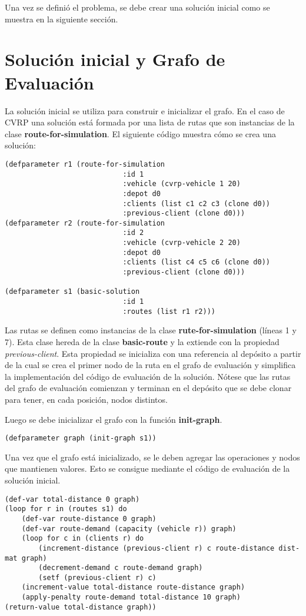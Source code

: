 Una vez se definió el problema, se debe crear una solución inicial como se muestra en la siguiente sección.

\section{Solución inicial y Grafo de Evaluación}\label{4-solution}

La solución inicial se utiliza para construir e inicializar el grafo. En el caso de CVRP una solución está formada por una lista de rutas que son instancias de la clase \textbf{route-for-simulation}. El siguiente código muestra cómo se crea una solución:


\begin{lstlisting}
(defparameter r1 (route-for-simulation 
							:id 1
							:vehicle (cvrp-vehicle 1 20) 
							:depot d0
							:clients (list c1 c2 c3 (clone d0))
							:previous-client (clone d0)))
(defparameter r2 (route-for-simulation 
							:id 2 
							:vehicle (cvrp-vehicle 2 20)
							:depot d0
							:clients (list c4 c5 c6 (clone d0))
							:previous-client (clone d0)))

(defparameter s1 (basic-solution
							:id 1 
							:routes (list r1 r2)))
\end{lstlisting}

Las rutas se definen como instancias de la clase \textbf{rute-for-simulation} (líneas 1 y 7). Esta clase hereda de la clase \textbf{basic-route} y la extiende con la propiedad \textit{previous-client}. Esta propiedad se inicializa con una referencia al depósito a partir de la cual se crea el primer nodo de la ruta en el grafo de evaluación y simplifica la implementación del código de evaluación de la solución. Nótese que las rutas del grafo de evaluación comienzan y terminan en el depósito que se debe clonar para tener, en cada posición, nodos distintos.

Luego se debe inicializar el grafo con la función \textbf{init-graph}.

\begin{lstlisting}
(defparameter graph (init-graph s1))
\end{lstlisting}

Una vez que el grafo está inicializado, se le deben agregar las operaciones y nodos que mantienen valores. Esto se consigue mediante el código de evaluación de la solución inicial.

\begin{lstlisting}
(def-var total-distance 0 graph)
(loop for r in (routes s1) do
	(def-var route-distance 0 graph)
	(def-var route-demand (capacity (vehicle r)) graph) 
	(loop for c in (clients r) do 
		(increment-distance (previous-client r) c route-distance dist-mat graph)
		(decrement-demand c route-demand graph) 
		(setf (previous-client r) c)
	(increment-value total-distance route-distance graph)
	(apply-penalty route-demand total-distance 10 graph)
(return-value total-distance graph))
\end{lstlisting}

